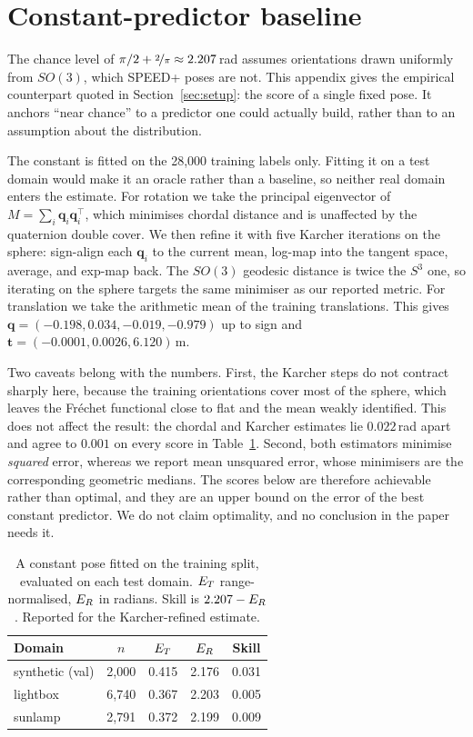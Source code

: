 \section{Constant-predictor baseline}
\label{app:constant}

The chance level of $\pi/2 + \nicefrac{2}{\pi} \approx 2.207$\,rad assumes orientations drawn
uniformly from $SO(3)$, which SPEED+ poses are not. This appendix gives the empirical
counterpart quoted in Section~\ref{sec:setup}: the score of a single fixed pose. It anchors
``near chance'' to a predictor one could actually build, rather than to an assumption about
the distribution.

The constant is fitted on the 28{,}000 training labels only. Fitting it on a test domain
would make it an oracle rather than a baseline, so neither real domain enters the estimate.
For rotation we take the principal eigenvector of $M = \sum_i \mathbf{q}_i
\mathbf{q}_i^{\top}$, which minimises chordal distance and is unaffected by the quaternion
double cover. We then refine it with five Karcher iterations on the sphere: sign-align each
$\mathbf{q}_i$ to the current mean, log-map into the tangent space, average, and exp-map back.
The $SO(3)$ geodesic distance is twice the $S^3$ one, so iterating on the sphere targets the
same minimiser as our reported metric. For translation we take the arithmetic mean of the
training translations. This gives $\mathbf{q} = (-0.198, 0.034, -0.019, -0.979)$ up to sign
and $\mathbf{t} = (-0.0001, 0.0026, 6.120)$\,m.

Two caveats belong with the numbers. First, the Karcher steps do not contract sharply here,
because the training orientations cover most of the sphere, which leaves the Fr\'echet
functional close to flat and the mean weakly identified. This does not affect the result: the
chordal and
Karcher estimates lie $0.022$\,rad apart and agree to $0.001$ on every score in
Table~\ref{tab:constant}. Second, both estimators minimise \emph{squared} error, whereas we
report mean unsquared error, whose minimisers are the corresponding geometric medians. The
scores below are therefore achievable rather than optimal, and they are an upper bound on the
error of the best constant predictor. We do not claim optimality, and no conclusion in the
paper needs it.

\begin{table}[ht]
  \caption{A constant pose fitted on the training split, evaluated on each test
  domain. $E_{T}$ range-normalised, $E_{R}$ in radians. Skill is
  $2.207 - E_{R}$. Reported for the Karcher-refined estimate.}
  \label{tab:constant}
  \centering
  \small
  \begin{tabular}{l c cc c}
    \toprule
    Domain & $n$ & $E_{T}$ & $E_{R}$ & Skill \\
    \midrule
    synthetic (val) & 2{,}000 & 0.415 & 2.176 & 0.031 \\
    lightbox & 6{,}740 & 0.367 & 2.203 & 0.005 \\
    sunlamp & 2{,}791 & 0.372 & 2.199 & 0.009 \\
    \bottomrule
  \end{tabular}
\end{table}

